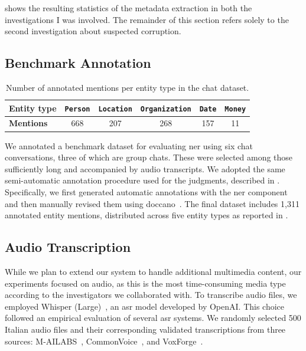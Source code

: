  shows the resulting statistics of the metadata extraction in both the investigations I was involved. The remainder of this section refers solely to the second investigation about suspected corruption.


\subsection{Benchmark Annotation}
\label{sec:wise_dataset}

\begin{table}[h]
\centering
\caption{Number of annotated mentions per entity type in the chat dataset.}
\begin{tabulary}{\textwidth}{LCCCCC}
\toprule
\textbf{Entity type} & \texttt{Person} & \texttt{Location} & \texttt{Organization} & \texttt{Date} & \texttt{Money} \\
\midrule
\textbf{Mentions} & 668 & 207 & 268 & 157 & 11 \\
\bottomrule
\end{tabulary}
\label{tab:chat_ner_stats}
\end{table}

We annotated a benchmark dataset for evaluating \ac{ner} using six chat conversations, three of which are group chats. These were selected among those sufficiently long and accompanied by audio transcripts. We adopted the same semi-automatic annotation procedure used for the judgments, described in . Specifically, we first generated automatic annotations with the \ac{ner} component and then manually revised them using doccano~\cite{doccano}.
The final dataset includes 1,311 annotated entity mentions, distributed across five entity types as reported in .


\subsection{Audio Transcription} \label{sec:wise_multimedia}



While we plan to extend our system to handle additional multimedia content, our experiments focused on audio, as this is the most time-consuming media type according to the investigators we collaborated with.  
To transcribe audio files, we employed Whisper (Large)~\cite{radford23a-whisper}, an \ac{asr} model developed by OpenAI. This choice followed an empirical evaluation of several \ac{asr} systems. We randomly selected 500 Italian audio files and their corresponding validated transcriptions from three sources: M-AILABS~\cite{m-ailabs_dataset}, CommonVoice~\cite{ardila-etal-2020-common}, and VoxForge~\cite{voxforge}.  

